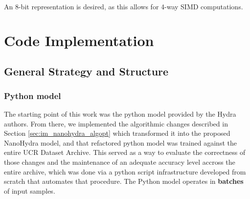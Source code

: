         An 8-bit representation is desired, as this allows for 4-way SIMD computations.

\section{Code Implementation}\label{sec:im_nanohydra_codeimp}

    \subsection{General Strategy and Structure}\label{sec:im_nanohydra_genstrat}

    \subsubsection{Python model}
    The starting point of this work was the python model provided by the Hydra authors. From there, we implemented the algorithmic changes described in Section \ref{sec:im_nanohydra_algopt}
    which transformed it into the proposed NanoHydra model, and that refactored python model was trained against the entire UCR Dataset Archive. This served as a way to evaluate the correctness of those changes 
    and the maintenance of an adequate accuracy level accross the entire archive, which was done via a python script infrastructure developed from scratch
    that automates that procedure. The Python model operates in \textbf{batches} of input samples.

